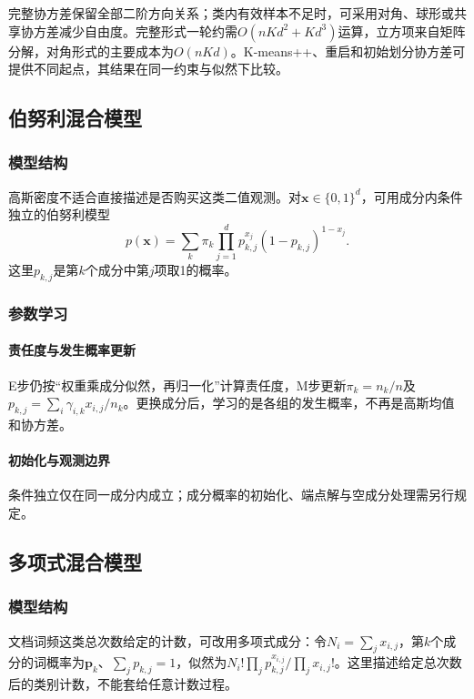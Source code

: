 完整协方差保留全部二阶方向关系；类内有效样本不足时，可采用对角、球形或共享协方差减少自由度。完整形式一轮约需$O(nKd^2+Kd^3)$运算，立方项来自矩阵分解，对角形式的主要成本为$O(nKd)$。K-means++、重启和初始划分协方差可提供不同起点，其结果在同一约束与似然下比较。

\subsection{伯努利混合模型}

\subsubsection{模型结构}

高斯密度不适合直接描述是否购买这类二值观测。对$\bm x\in\{0,1\}^d$，可用成分内条件独立的伯努利模型
\[
 p(\bm x)=\sum_k\pi_k\prod_{j=1}^d
 p_{k,j}^{x_j}(1-p_{k,j})^{1-x_j}.
\]
这里$p_{k,j}$是第$k$个成分中第$j$项取1的概率。

\subsubsection{参数学习}

\paragraph{责任度与发生概率更新}

E步仍按“权重乘成分似然，再归一化”计算责任度，M步更新$\pi_k=n_k/n$及$p_{k,j}=\sum_i\gamma_{i,k}x_{i,j}/n_k$。更换成分后，学习的是各组的发生概率，不再是高斯均值和协方差。

\paragraph{初始化与观测边界}

条件独立仅在同一成分内成立；成分概率的初始化、端点解与空成分处理需另行规定。

\subsection{多项式混合模型}

\subsubsection{模型结构}

文档词频这类总次数给定的计数，可改用多项式成分：令$N_i=\sum_jx_{i,j}$，第$k$个成分的词概率为$\bm p_k$、$\sum_jp_{k,j}=1$，似然为$N_i!\prod_jp_{k,j}^{x_{i,j}}/\prod_jx_{i,j}!$。这里描述给定总次数后的类别计数，不能套给任意计数过程。

